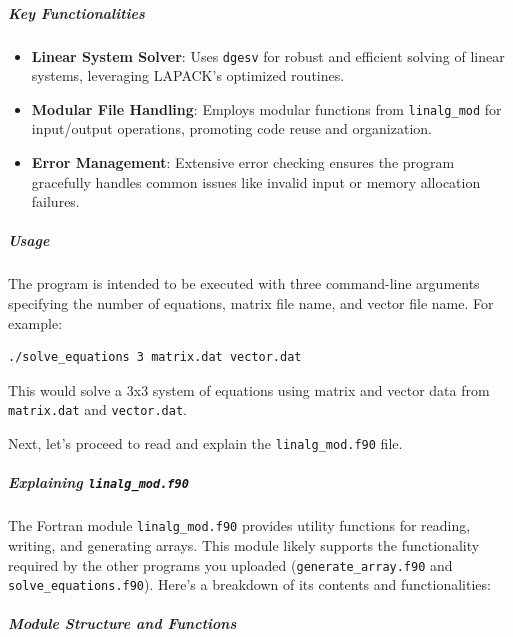 \subparagraph{Key Functionalities}

\begin{itemize}
\item \textbf{Linear System Solver}: Uses \texttt{dgesv} for robust and efficient solving of linear systems, leveraging LAPACK's optimized routines.
\item \textbf{Modular File Handling}: Employs modular functions from \texttt{linalg\_mod} for input/output operations, promoting code reuse and organization.
\item \textbf{Error Management}: Extensive error checking ensures the program gracefully handles common issues like invalid input or memory allocation failures.
\end{itemize}

\subparagraph{Usage}

The program is intended to be executed with three command-line arguments specifying the number of equations, matrix file name, and vector file name. For example:

\begin{verbatim}
./solve_equations 3 matrix.dat vector.dat
\end{verbatim}

This would solve a 3x3 system of equations using matrix and vector data from \texttt{matrix.dat} and \texttt{vector.dat}.

Next, let's proceed to read and explain the \texttt{linalg\_mod.f90} file.

\subparagraph{Explaining \texttt{linalg\_mod.f90}}

The Fortran module \texttt{linalg\_mod.f90} provides utility functions for reading, writing, and generating arrays. This module likely supports the functionality required by the other programs you uploaded (\texttt{generate\_array.f90} and \texttt{solve\_equations.f90}). Here's a breakdown of its contents and functionalities:

\subparagraph{Module Structure and Functions}

